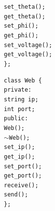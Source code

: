 \begin{flushleft}
\begin{flushleft}
        \quad\quad\texttt{set\_theta();} \\
        \quad\quad\texttt{get\_theta();} \\
        \quad\quad\texttt{set\_phi();} \\
        \quad\quad\texttt{get\_phi();} \\
        \quad\quad\texttt{set\_voltage();} \\
        \quad\quad\texttt{get\_voltage();} \\
        \texttt{\};} \\
    \end{flushleft}
    \begin{flushleft}
        \texttt{class Web \{}  \\
        \quad\texttt{private:} \\
        \quad\quad\texttt{string ip;} \\
        \quad\quad\texttt{int port;} \\
        \quad\texttt{public:} \\
        \quad\quad\texttt{Web();} \\
        \quad\quad\texttt{$\sim$Web();} \\
        \quad\quad\texttt{set\_ip();} \\
        \quad\quad\texttt{get\_ip();} \\
        \quad\quad\texttt{set\_port();} \\
        \quad\quad\texttt{get\_port();} \\
        \quad\quad\texttt{receive();} \\
        \quad\quad\texttt{send();} \\
        \texttt{\};} \\
    \end{flushleft}

\end{flushleft}
